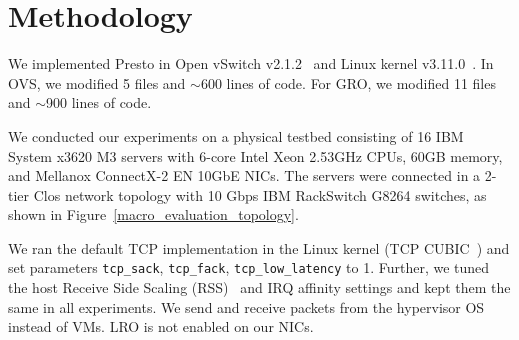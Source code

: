\section{Methodology}
\label{sec:method}

We implemented Presto in Open vSwitch v2.1.2~\cite{ovs-website} and Linux kernel v3.11.0~\cite{kernel}.
In OVS, we modified 5 files and $\sim$600 lines of code. For GRO, we modified 11 files and $\sim$900 lines of code.




 We conducted our experiments on a physical
testbed consisting of 16 IBM System x3620 M3 servers with 6-core Intel Xeon
2.53GHz CPUs, 60GB memory, and Mellanox ConnectX-2 EN 10GbE NICs. 
The servers were connected in a 2-tier Clos network topology with 10 Gbps
IBM RackSwitch G8264 switches, as shown in Figure~\ref{macro_evaluation_topology}.

We ran the default TCP implementation in the Linux kernel (TCP CUBIC~\cite{cubic})
and set parameters {\tt tcp\_sack}, {\tt tcp\_fack}, {\tt tcp\_low\_latency} to 1. 
Further, we tuned the host Receive Side Scaling (RSS)~\cite{rss} and IRQ affinity settings and kept them the same in all experiments.
We send and receive packets from the hypervisor OS instead of VMs. 
LRO is not enabled on our NICs.

